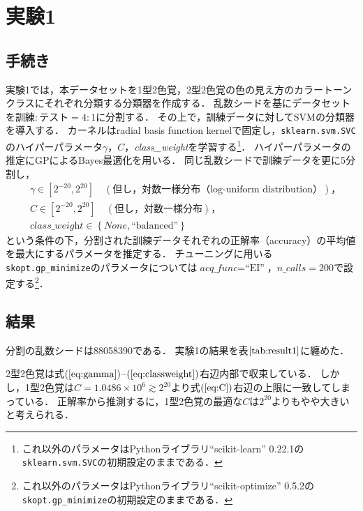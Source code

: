 \documentclass[uplatex,paper=a4,fontsize=4.0truemm,jafontsize=4.0truemm,head_space=30.0truemm,foot_space=30.0truemm,baselineskip=8.0truemm,line_length=40zw,gutter=25.0truemm,oneside,openany,fleqn,hanging_panctuation,open_bracket_pos=nibu_tentsuki,dvipdfmx,jis2004,book,titlepage]{jlreq}
\theoremstyle{mystyle}
\newcommand{\mathdisplaystyle}[1]{\(\displaystyle{#1}\)}
\newcommand{\Reference}[1]{\mathdisplaystyle{\ref{#1}}}
\newcommand{\Equationreference}[1]{\mathdisplaystyle{\parentheses{\ref{#1}}}}
\newcommand{\negativevalue}[1]{{-#1}}
\newcommand{\parentheses}[1]{\left(#1\right)}
\newcommand{\braces}[1]{\left\{#1\right\}}
\newcommand{\squarebrackets}[1]{\left[#1\right]}
\begin{document}
		\section{実験1}
			\subsection{手続き}
				実験1では，本データセットを1型2色覚，2型2色覚の色の見え方のカラートーンクラスにそれぞれ分類する分類器を作成する．
				乱数シードを基にデータセットを訓練\mathdisplaystyle{:}テスト\mathdisplaystyle{=4:1}に分割する．
				その上で，訓練データに対してSVMの分類器を導入する．
				カーネルはradial basis function kernelで固定し，\texttt{sklearn{.}svm{.}SVC}のハイパーパラメータ\mathdisplaystyle{\gamma}，\mathdisplaystyle{C}，\textit{class\_weight}を学習する\footnote{これ以外のパラメータはPythonライブラリ``scikit-learn'' 0.22.1の\texttt{sklearn{.}svm{.}SVC}の初期設定のままである．}．
				ハイパーパラメータの推定にGPによるBayes最適化を用いる．
				同じ乱数シードで訓練データを更に5分割し，
				\begin{align}
					&\gamma\in\squarebrackets{2^\negativevalue{20},2^{20}}\quad\parentheses{\textrm{但し，対数一様分布（log-uniform distribution）}}\textrm{，}\label{eq:gamma}\\
					&C\in\squarebrackets{2^\negativevalue{20},2^{20}}\quad\parentheses{\textrm{但し，対数一様分布}}\textrm{，}\label{eq:C}\\
					&\textit{class\_weight}\in\braces{\textit{None},\textrm{``balanced''}}\label{eq:classweight}
				\end{align}
				という条件の下，分割された訓練データそれぞれの正解率（accuracy）の平均値を最大にするパラメータを推定する．
				チューニングに用いる\texttt{skopt{.}gp\_minimize}のパラメータについては\mathdisplaystyle{\textit{acq\_func}=\textrm{``EI''}}，\mathdisplaystyle{\textit{n\_calls}=200}で設定する\footnote{これ以外のパラメータはPythonライブラリ``scikit-optimize'' 0.5.2の\texttt{\texttt{skopt{.}gp\_minimize}}の初期設定のままである．}．
			\subsection{結果}
				分割の乱数シードは88058390である．
				実験1の結果を表\Reference{tab:result1}に纏めた．

				2型2色覚は式\Equationreference{eq:gamma}--\Equationreference{eq:classweight}右辺内部で収束している．
				しかし，1型2色覚は\mathdisplaystyle{C=1.0486\times10^6\gtrsim2^{20}}より式\Equationreference{eq:C}右辺の上限に一致してしまっている．
				正解率から推測するに，1型2色覚の最適な\mathdisplaystyle{C}は\mathdisplaystyle{2^{20}}よりもやや大きいと考えられる．
\end{document}
